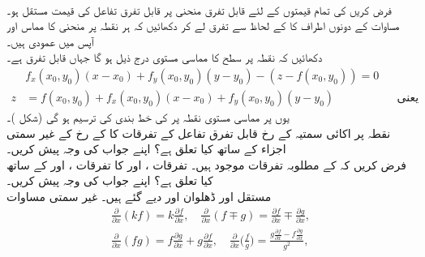 \\
فرض کریں  کی تمام قیمتوں کے لئے قابل تفرق منحنی  پر  قابل تفرق تفاعل  کی قیمت  مستقل  ہو۔ مساوات  کے دونوں اطراف کا  کے لحاظ سے تفرق لے کر دکھائیں کہ ہر نقطہ پر منحنی کا مماس اور   آپس میں عمودی ہیں۔ 
\\
دکھائیں کہ نقطہ  پر سطح   کا مماسی مستوی  درج ذیل ہو گا جہاں  قابل تفرق ہے۔
\begin{align*}
&f_x(x_0,y_0)(x-x_0)+f_y(x_0,y_0)(y-y_0)-(z-f(x_0,y_0))=0\\
z&=f(x_0,y_0)+f_x(x_0,y_0)(x-x_0)+f_y(x_0,y_0)(y-y_0)&&\text{یعنی}
\end{align*} 
یوں  پر مماسی مستوی  نقطہ  پر  کی خط بندی کی ترسیم ہو گی (شکل )۔
\\
نقطہ  پر اکائی سمتیہ   کے رخ قابل تفرق تفاعل   کے تفرقات  کا   کے رخ   کے غیر سمتی اجزاء کے ساتھ کیا  تعلق ہے؟ اپنے جواب کی وجہ پیش کریں۔
\\
فرض کریں کہ  کے مطلوبہ تفرقات موجود ہیں۔ تفرقات ،  اور  کا تفرقات ،  اور  کے ساتھ کیا تعلق ہے؟ اپنے جواب کی وجہ پیش کریں۔
\\
مستقل  اور ڈھلوان  اور    دیے گئے ہیں۔  غیر سمتی مساوات
\begin{align*}
\frac{\partial}{\partial x}(kf)=k\frac{\partial f}{\partial x},\quad \frac{\partial}{\partial x}(f\mp g)=\frac{\partial f}{\partial x}\mp \frac{\partial g}{\partial x},\\
\frac{\partial}{\partial x}(fg)=f\frac{\partial g}{\partial x}+g\frac{\partial f}{\partial x},\quad \frac{\partial}{\partial x}\big(\frac{f}{g}\big)=\frac{g\frac{\partial f}{\partial x}-f\frac{\partial g}{\partial x}}{g^2},
\end{align*}
